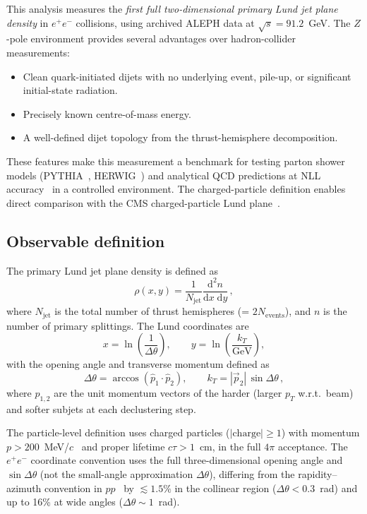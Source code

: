 \documentclass[11pt,a4paper]{article}
\begin{document}
This analysis measures the \emph{first full two-dimensional primary
Lund jet plane density} in $e^+e^-$ collisions, using archived
ALEPH data at $\sqrt{s} = 91.2$~GeV.  The $Z$-pole environment
provides several advantages over hadron-collider measurements:
\begin{itemize}
\item Clean quark-initiated dijets with no underlying event, pile-up,
  or significant initial-state radiation.
\item Precisely known centre-of-mass energy.
\item A well-defined dijet topology from the thrust-hemisphere
  decomposition.
\end{itemize}
These features make this measurement a benchmark for testing parton
shower models (PYTHIA~\cite{Sjostrand:2014zea,Skands:2014pea},
HERWIG~\cite{Bellm:2015jjp}) and analytical QCD predictions at NLL
accuracy~\cite{Lifson:2020gua} in a controlled environment.  The
charged-particle definition enables direct comparison with the CMS
charged-particle Lund plane~\cite{CMS:2024mlf}.

\subsection{Observable definition}
\label{sec:obs-def}

The primary Lund jet plane density is defined as
\begin{equation}
  \rho(x, y) = \frac{1}{N_\text{jet}}
  \frac{\mathrm{d}^2 n}{\mathrm{d}x\;\mathrm{d}y}\,,
  \label{eq:rho-def}
\end{equation}
where $N_\text{jet}$ is the total number of thrust hemispheres
(= $2 N_\text{events}$), and $n$ is the number of primary
splittings.  The Lund coordinates are
\begin{equation}
  x = \ln\!\left(\frac{1}{\Delta\theta}\right), \qquad
  y = \ln\!\left(\frac{k_T}{\text{GeV}}\right),
  \label{eq:coords}
\end{equation}
with the opening angle and transverse momentum defined as
\begin{equation}
  \Delta\theta = \arccos\!\left(\hat{p}_1 \cdot \hat{p}_2\right),
  \qquad
  k_T = |\vec{p}_2|\,\sin\Delta\theta\,,
  \label{eq:kt-dtheta}
\end{equation}
where $\hat{p}_{1,2}$ are the unit momentum vectors of the harder
(larger $p_T$ w.r.t.\ beam) and softer subjets at each declustering
step.

The particle-level definition uses charged particles ($|\text{charge}|
\ge 1$) with momentum $p > 200$~MeV/$c$~\cite{ALEPH:1998hhr,ALEPH:1998vtv}
and proper lifetime $c\tau > 1$~cm, in the full $4\pi$ acceptance.
The $e^+e^-$ coordinate convention uses the full three-dimensional
opening angle and $\sin\Delta\theta$ (not the small-angle approximation
$\Delta\theta$), differing from the rapidity--azimuth convention in
$pp$~\cite{Dreyer:2018nbf} by $\lesssim\!1.5\%$ in the collinear
region ($\Delta\theta < 0.3$~rad) and up to 16\% at wide angles
($\Delta\theta \sim 1$~rad).
\end{document}
